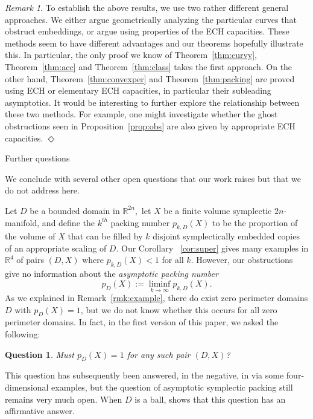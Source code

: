 \documentclass[11pt, reqno]{amsart}
\makeatletter
\def\subsection{\@startsection{subsection}{2}%
  \z@{.75\linespacing\@plus.7\linespacing}{-.5em}%
  {\normalfont\large\bfseries}}
\newtheorem{question}[thm]{Question}
\theoremstyle{remark}
\numberwithin{equation}{subsection}
\numberwithin{figure}{section}
\theoremstyle{customremark}
\newtheorem{rmk_no_diamond}[thm]{Remark}
\newenvironment{rmk}{\begin{rmk_no_diamond} } {\hfill$\er$ \end{rmk_no_diamond}}
\newcommand{\er}{{\Diamond}}
\newcommand{\R}{\mathbb{R}}
\makeatother
\begin{document}
 
\begin{rmk}\rm To establish the above results, we use 
two rather different general approaches.  We either argue geometrically 
analyzing the particular curves that obstruct embeddings, or argue using properties of the ECH capacities.  These methods seem to have different advantages and our theorems hopefully illustrate this.  In particular, the only proof we know of Theorem~\ref{thm:curvy}, Theorem~\ref{thm:acc} and Theorem~\ref{thm:class} takes the first approach. On the other hand, Theorem~\ref{thm:convexper} and Theorem~\ref{thm:packing} are proved using ECH or elementary ECH capacities,  in particular their subleading asymptotics.  It would be interesting to further explore the relationship between these two methods. For example, one might investigate whether the ghost obstructions seen in  Proposition~\ref{prop:obs} are also given by appropriate ECH capacities.
\end{rmk}

\subsection{Further questions}

We conclude with several other open questions that our work raises but that we do not address here.

Let $D$ be a bounded domain in $\mathbb{R}^{2n},$ let $X$ be a finite volume symplectic $2n$-manifold, and define the $k^{th}$ packing number $p_{k,D}(X)$ to be the proportion of the volume of $X$ that can be filled by $k$ disjoint symplectically embedded copies of an appropriate scaling of $D$.  Our Corollary ~\ref{cor:super} gives many examples in $\R^4$ of pairs $(D,X)$ where $p_{k,D}(X) < 1$ for all $k$.  However, our obstructions give no information about the  
{\em asymptotic packing number}
\[p_D(X) := \liminf_{k \to \infty} p_{k,D}(X).\]
As we explained in Remark~\ref{rmk:example}, there do exist zero perimeter domains $D$ with $p_D(X) = 1$, but we do not know whether this occurs for all zero perimeter domains.  
In fact, 
in the first version of this paper, we asked the following:

\begin{question}
Must $p_D(X) = 1$ for any such pair $(D,X)$?
\end{question}

This question has subsequently been answered, in the negative, in \cite{cghi} via some four-dimensional examples, but the question of asymptotic symplectic packing still remains very much open.  When $D$ is a ball, \cite[Rem. 1.5.G]{McPolt} shows that this question has an affirmative answer.
\end{document}
